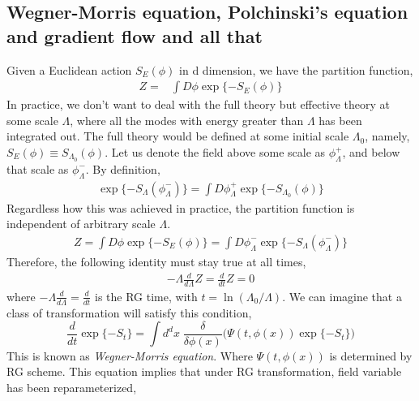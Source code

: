 \documentclass[a4paper,11pt]{article}
\begin{document}
\subsection{Wegner-Morris equation, Polchinski's equation and gradient flow and all that}
Given a Euclidean action $S_E(\phi)$ in d dimension, we have the partition function,
\begin{equation}
\begin{split}
Z=&\int D\phi \exp\{-S_E(\phi)\}
\end{split}
\end{equation}
In practice, we don't want to deal with the full theory but effective theory at some scale $\Lambda$, where all the modes with energy greater than $\Lambda$ has been integrated out. The full theory would be defined at some initial scale $\Lambda_0$, namely, $S_E(\phi) \equiv S_{\Lambda_0}(\phi)$. Let us denote the field above some scale as $\phi_\Lambda^+$, and below that scale as $\phi_\Lambda^-$. By definition,
\begin{equation}
\begin{split}
\exp\{-S_{\Lambda}(\phi_\Lambda^-)\}
=\int D\phi_{\Lambda}^+ \exp\{-S_{\Lambda_0}(\phi)\}
\end{split}
\end{equation}
Regardless how this was achieved in practice, the partition function is independent of arbitrary scale $\Lambda$.
\begin{equation}
\begin{split}
Z=\int D\phi \exp\{-S_E(\phi)\} =\int D\phi_{\Lambda}^- \exp\{-S_{\Lambda}(\phi_\Lambda^-)\}
\end{split}
\end{equation}
Therefore, the following identity must stay true at all times,
\begin{equation}
\begin{split}
-\Lambda \frac{d}{d \Lambda}Z = \frac{d}{dt} Z =0
\end{split}
\end{equation}
where $-\Lambda \frac{d}{d \Lambda} = \frac{d}{dt }$ is the RG time, with $t=\ln(\Lambda_0/\Lambda)$. We can imagine that a class of transformation will satisfy this condition,
\begin{equation}
\frac{d}{dt }\exp\{-S_{t}\}=\int d^dx \;\frac{\delta}{\delta \phi(x)}\Big(  \Psi(t, \phi(x)) \exp\{-S_{t}\} \Big)
\end{equation}
This is known as \textit{Wegner-Morris equation}. Where $\Psi(t, \phi(x))$ is determined by RG scheme. This equation implies that under RG transformation, field variable has been reparameterized, 
\end{document}
